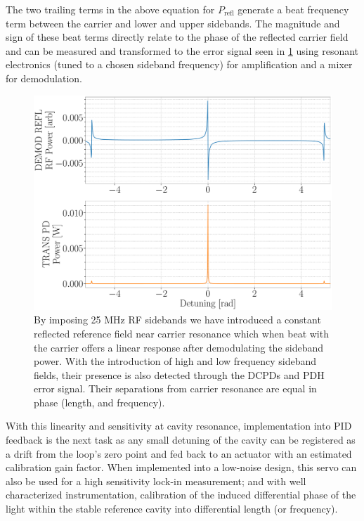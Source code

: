 The two trailing terms in the above equation for $P_\mathrm{refl}$ generate a beat frequency term between the carrier and lower and upper sidebands. The magnitude and sign of these beat terms directly relate to the phase of the reflected carrier field and can be measured and transformed to the error signal seen in \ref{fig:pdh_error} using resonant electronics (tuned to a chosen sideband frequency) for amplification and a mixer for demodulation.

\begin{figure}[H]
	\includegraphics[width=\textwidth]{figs/ALGAAS/pdh_error.pdf}
	\caption{By imposing 25 MHz RF sidebands we have introduced a constant reflected reference field near carrier resonance which when beat with the carrier offers a linear response after demodulating the sideband power. With the introduction of high and low frequency sideband fields, their presence is also detected through the DCPDs and PDH error signal. Their separations from carrier resonance are equal in phase (length, and frequency).}
\label{fig:pdh_error}
\end{figure}

With this linearity and sensitivity at cavity resonance, implementation into PID feedback is the next task as any small detuning of the cavity can be registered as a drift from the loop's zero point and fed back to an actuator with an estimated calibration gain factor. When implemented into a low-noise design, this servo can also be used for a high sensitivity lock-in measurement; and with well characterized instrumentation, calibration of the induced differential phase of the light within the stable reference cavity into differential length (or frequency).


